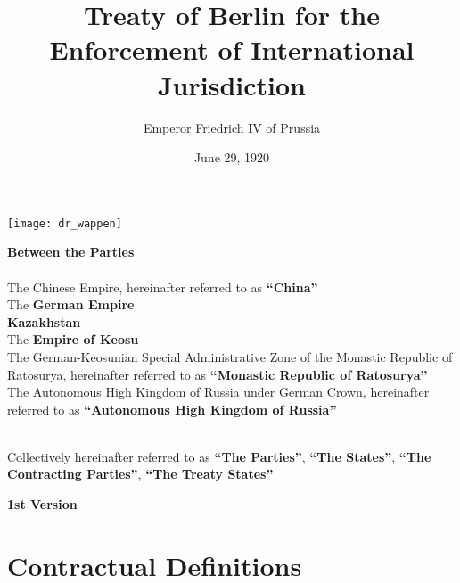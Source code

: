 \documentclass{article}
\title{Treaty of Berlin for the Enforcement of International Jurisdiction}
\author{Emperor Friedrich IV of Prussia}
\date{June 29, 1920}
\begin{document}
\maketitle
\begin{center}
    \texttt{[image: dr\_wappen]}
\end{center}
\begin{center}
    \textbf{Between the Parties\\}\textbf{\\}
    The Chinese Empire, hereinafter referred to as \textbf{``China''\\}
    The \textbf{German Empire\\}
    \textbf{Kazakhstan\\}
    The \textbf{Empire of Keosu\\}
    The German-Keosunian Special Administrative Zone of the Monastic Republic of Ratosurya, hereinafter referred to as \textbf{``Monastic Republic of Ratosurya''\\}
    The Autonomous High Kingdom of Russia under German Crown, hereinafter referred to as \textbf{``Autonomous High Kingdom of Russia''\\}
    \textbf{\\}

    Collectively hereinafter referred to as \textbf{``The Parties''}, \textbf{``The States''}, \textbf{``The Contracting Parties''}, \textbf{``The Treaty States''}
\end{center}
\newpage
{}
\vspace*{\fill}
\begin{Center}
\textbf{1st Version}
\vspace*{\fill}
\end{Center}
\newpage
\tableofcontents
\newpage
\section{Contractual Definitions}
\end{document}

